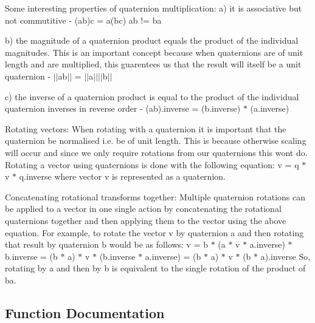Some interesting properties of quaternion multiplication\+: a) it is associative but not commutitive -\/ (ab)c = a(bc) ab != ba

b) the magnitude of a quaternion product equals the product of the individual magnitudes. This is an important concept because when quaternions are of unit length and are multiplied, this guarentees us that the result will itself be a unit quaternion -\/ $\vert$$\vert$ab$\vert$$\vert$ = $\vert$$\vert$a$\vert$$\vert$$\vert$$\vert$b$\vert$$\vert$

c) the inverse of a quaternion product is equal to the product of the individual quaternion inverses in reverse order -\/ (ab).inverse = (b.\+inverse) $\ast$ (a.\+inverse)

Rotating vectors\+: When rotating with a quaternion it is important that the quaternion be normalised i.\+e. be of unit length. This is because otherwise scaling will occur and since we only require rotations from our quaternions this won\textquotesingle{}t do. Rotating a vector using quaternions is done with the following equation\+: v\textquotesingle{} = q $\ast$ v $\ast$ q.\+inverse where vector v is represented as a quaternion.

Concatenating rotational transforms together\+: Multiple quaternion rotations can be applied to a vector in one single action by concatenating the rotational quaternions together and then applying them to the vector using the above equation. For example, to rotate the vector v by quaternion a and then rotating that result by quaternion b would be as follows\+: v\textquotesingle{} = b $\ast$ (a $\ast$ v $\ast$ a.\+inverse) $\ast$ b.\+inverse = (b $\ast$ a) $\ast$ v $\ast$ (b.\+inverse $\ast$ a.\+inverse) = (b $\ast$ a) $\ast$ v $\ast$ (b $\ast$ a).inverse So, rotating by a and then by b is equivalent to the single rotation of the product of ba. 

\subsection{Function Documentation}
